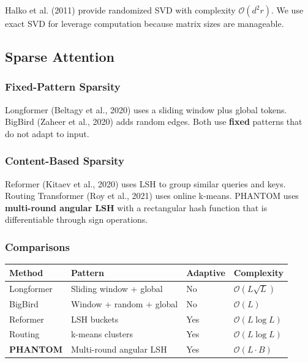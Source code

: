 Halko et al. (2011) provide randomized SVD with complexity 
$\mathcal{O}(d^2 r)$. We use exact SVD for leverage computation because 
matrix sizes are manageable.

\subsection{Sparse Attention}

\subsubsection{Fixed-Pattern Sparsity}

Longformer (Beltagy et al., 2020) uses a sliding window plus global tokens. 
BigBird (Zaheer et al., 2020) adds random edges. Both use \textbf{fixed} patterns 
that do not adapt to input.

\subsubsection{Content-Based Sparsity}

Reformer (Kitaev et al., 2020) uses LSH to group similar queries and keys. 
Routing Transformer (Roy et al., 2021) uses online k-means. PHANTOM uses 
\textbf{multi-round angular LSH} with a rectangular hash function that is 
differentiable through sign operations.

\subsubsection{Comparisons}

\begin{table}[H]
\centering
\small
\begin{tabular}{llll}
\toprule
\textbf{Method} & \textbf{Pattern} & \textbf{Adaptive} & \textbf{Complexity} \\
\midrule
Longformer & Sliding window + global & No & $\mathcal{O}(L \sqrt{L})$ \\
BigBird & Window + random + global & No & $\mathcal{O}(L)$ \\
Reformer & LSH buckets & Yes & $\mathcal{O}(L \log L)$ \\
Routing & k-means clusters & Yes & $\mathcal{O}(L \log L)$ \\
\textbf{PHANTOM} & Multi-round angular LSH & Yes & $\mathcal{O}(L \cdot B)$ \\
\bottomrule
\end{tabular}
\end{table}

